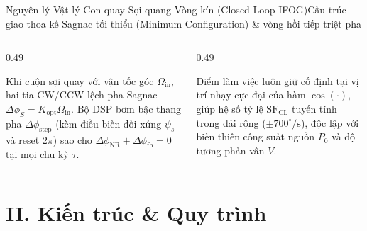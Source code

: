 \documentclass[aspectratio=169,8pt]{beamer}
\begin{document}
\begin{frame}{Nguyên lý Vật lý Con quay Sợi quang Vòng kín (Closed-Loop IFOG)}{Cấu trúc giao thoa kế Sagnac tối thiểu (Minimum Configuration) \& vòng hồi tiếp triệt pha}
\vspace{0.08cm}
\begin{columns}[T]
  \begin{column}{0.49\textwidth}
    \begin{eqbox}
      Khi cuộn sợi quay với vận tốc góc $\Omega_{\text{in}}$, hai tia CW/CCW lệch pha Sagnac $\Delta\phi_S = K_{\text{opt}}\Omega_{\text{in}}$. Bộ DSP bơm bậc thang pha $\Delta\phi_{\text{step}}$ (kèm điều biến đối xứng $\psi_s$ và reset $2\pi$) sao cho $\Delta\phi_{\text{NR}} + \Delta\phi_{\text{fb}} = 0$ tại mọi chu kỳ $\tau$.
    \end{eqbox}
  \end{column}
  \begin{column}{0.49\textwidth}
    \begin{remarkbox}
      Điểm làm việc luôn giữ cố định tại vị trí nhạy cực đại của hàm $\cos(\cdot)$, giúp hệ số tỷ lệ $\mathrm{SF}_{\text{CL}}$ tuyến tính trong dải rộng ($\pm 700^\circ/\text{s}$), độc lập với biến thiên công suất nguồn $P_0$ và độ tương phản vân $V$.
    \end{remarkbox}
  \end{column}
\end{columns}
\end{frame}

\section{II. Kiến trúc \& Quy trình}
\end{document}
